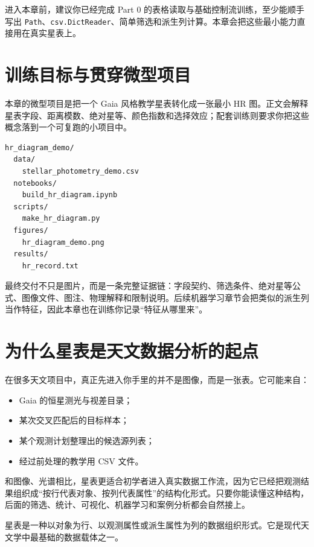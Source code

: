 进入本章前，建议你已经完成 Part 0 的表格读取与基础控制流训练，至少能顺手写出 \texttt{Path}、\texttt{csv.DictReader}、简单筛选和派生列计算。本章会把这些最小能力直接用在真实星表上。

\section{训练目标与贯穿微型项目}

本章的微型项目是把一个 Gaia 风格教学星表转化成一张最小 HR 图。正文会解释星表字段、距离模数、绝对星等、颜色指数和选择效应；配套训练则要求你把这些概念落到一个可复跑的小项目中。

\begin{examplebox}[最小 HR 图项目结构]
\begin{lstlisting}[style=terminal]
hr_diagram_demo/
  data/
    stellar_photometry_demo.csv
  notebooks/
    build_hr_diagram.ipynb
  scripts/
    make_hr_diagram.py
  figures/
    hr_diagram_demo.png
  results/
    hr_record.txt
\end{lstlisting}
\end{examplebox}

最终交付不只是图片，而是一条完整证据链：字段契约、筛选条件、绝对星等公式、图像文件、图注、物理解释和限制说明。后续机器学习章节会把类似的派生列当作特征，因此本章也在训练你记录“特征从哪里来”。

\section{为什么星表是天文数据分析的起点}

在很多天文项目中，真正先进入你手里的并不是图像，而是一张表。它可能来自：

\begin{itemize}
    \item Gaia 的恒星测光与视差目录；
    \item 某次交叉匹配后的目标样本；
    \item 某个观测计划整理出的候选源列表；
    \item 经过前处理的教学用 CSV 文件。
\end{itemize}

和图像、光谱相比，星表更适合初学者进入真实数据工作流，因为它已经把观测结果组织成“按行代表对象、按列代表属性”的结构化形式。只要你能读懂这种结构，后面的筛选、统计、可视化、机器学习和案例分析都会自然接上。

\begin{defbox}[星表]
星表是一种以对象为行、以观测属性或派生属性为列的数据组织形式。它是现代天文学中最基础的数据载体之一。
\end{defbox}

